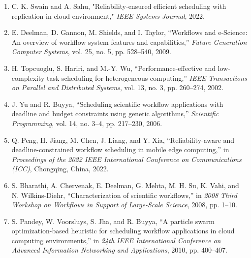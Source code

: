 \documentclass[12pt]{tcc}
\begin{document}
	\begin{enumerate}
    \item C. K. Swain and A. Sahu, "Reliability-ensured efficient scheduling with replication in cloud environment," \textit{IEEE Systems Journal}, 2022.

    \item E. Deelman, D. Gannon, M. Shields, and I. Taylor, “Workflows and e-Science: An overview of workflow system features and capabilities,” \textit{Future Generation Computer Systems}, vol. 25, no. 5, pp. 528–540, 2009.

    \item H. Topcuoglu, S. Hariri, and M.-Y. Wu, “Performance-effective and low-complexity task scheduling for heterogeneous computing,” \textit{IEEE Transactions on Parallel and Distributed Systems}, vol. 13, no. 3, pp. 260–274, 2002.
    
    \item J. Yu and R. Buyya, “Scheduling scientific workflow applications with deadline and budget constraints using genetic algorithms,” \textit{Scientific Programming}, vol. 14, no. 3–4, pp. 217–230, 2006.
    
     \item Q. Peng, H. Jiang, M. Chen, J. Liang, and Y. Xia, “Reliability-aware and deadline-constrained workflow scheduling in mobile edge computing,” in \textit{Proceedings of the 2022 IEEE International Conference on Communications (ICC)}, Chongqing, China, 2022.
     
    \item S. Bharathi, A. Chervenak, E. Deelman, G. Mehta, M. H. Su, K. Vahi, and N. Wilkins-Diehr, “Characterization of scientific workflows,” in \textit{2008 Third Workshop on Workflows in Support of Large-Scale Science}, 2008, pp. 1–10.

    \item S. Pandey, W. Voorsluys, S. Jha, and R. Buyya, “A particle swarm optimization-based heuristic for scheduling workflow applications in cloud computing environments,” in \textit{24th IEEE International Conference on Advanced Information Networking and Applications}, 2010, pp. 400–407.

   

\end{enumerate}
	
	
	\label{lastpage}
\end{document}
